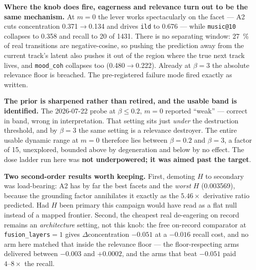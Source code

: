\documentclass[11pt]{article}
\begin{document}
\textbf{Where the knob does fire, eagerness and relevance turn out to be the same
mechanism.} At $m=0$ the lever works spectacularly on the facet --- A2 cuts
concentration \num{0.371}$\to$\num{0.134} and drives \texttt{ild} to \num{0.676}
--- while \texttt{music@10} collapses to \num{0.358} and recall to \num{20} of
\num{1431}. There is no separating window: \SI{27}{\percent} of real transitions
are negative-cosine, so pushing the prediction away from the current track's latent
also pushes it out of the region where the true next track lives, and
\texttt{mood\_coh} collapses too (\num{0.480}$\to$\num{0.222}). Already at
$\beta=3$ the absolute relevance floor is breached. The pre-registered failure mode
fired exactly as written.

\textbf{The prior is sharpened rather than retired, and the usable band is
identified.} The 2026-07-22 probe at $\beta \le \num{0.2}$, $m=0$ reported ``weak''
--- correct in band, wrong in interpretation. That setting sits just \emph{under}
the destruction threshold, and by $\beta=3$ the same setting is a relevance
destroyer. The entire usable dynamic range at $m=0$ therefore lies between
$\beta=\num{0.2}$ and $\beta=\num{3}$, a factor of \num{15}, unexplored, bounded
above by degeneration and below by no effect. The dose ladder run here was
\textbf{not underpowered; it was aimed past the target}.

\textbf{Two second-order results worth keeping.} First, demoting $H$ to secondary
was load-bearing: A2 has by far the best facets and the \emph{worst} $H$
(\num{0.003569}), because the grounding factor annihilates it exactly as the
$\num{5.46}\times$ derivative ratio predicted. Had $H$ been primary this campaign
would have read as a flat null instead of a mapped frontier. Second, the cheapest
real de-eagering on record remains an \emph{architecture} setting, not this knob:
the free on-record comparator at \texttt{fusion\_layers}${}=1$ gives
$\Delta$concentration $-\num{0.051}$ at a $-\num{0.016}$ recall cost, and no arm
here matched that inside the relevance floor --- the floor-respecting arms delivered
between $-\num{0.003}$ and $+\num{0.0002}$, and the arms that beat $-\num{0.051}$
paid $\numrange{4}{8}\times$ the recall.
\end{document}

